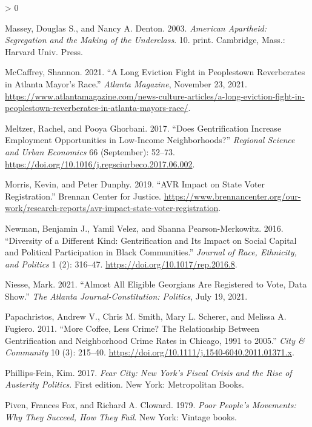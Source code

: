 \documentclass[
  12pt,
]{article}
\newlength{\cslhangindent}
\newenvironment{CSLReferences}[2] %
 {%
  \setlength{\parindent}{0pt}
  \ifodd #1 \everypar{\setlength{\hangindent}{\cslhangindent}}\ignorespaces\fi
  \ifnum #2 > 0
  \setlength{\parskip}{#2\baselineskip}
  \fi
 }%
 {}
\begin{document}
\begin{CSLReferences}{1}{0}
\leavevmode\hypertarget{ref-Massey2003}{}%
Massey, Douglas S., and Nancy A. Denton. 2003. \emph{American Apartheid: Segregation and the Making of the Underclass}. 10. print. {Cambridge, Mass.}: {Harvard Univ. Press}.

\leavevmode\hypertarget{ref-McCaffrey2021}{}%
McCaffrey, Shannon. 2021. {``A Long Eviction Fight in {Peoplestown} Reverberates in {Atlanta} Mayor's Race.''} \emph{Atlanta Magazine}, November 23, 2021. \url{https://www.atlantamagazine.com/news-culture-articles/a-long-eviction-fight-in-peoplestown-reverberates-in-atlanta-mayors-race/}.

\leavevmode\hypertarget{ref-Meltzer2017}{}%
Meltzer, Rachel, and Pooya Ghorbani. 2017. {``Does Gentrification Increase Employment Opportunities in Low-Income Neighborhoods?''} \emph{Regional Science and Urban Economics} 66 (September): 52--73. \url{https://doi.org/10.1016/j.regsciurbeco.2017.06.002}.

\leavevmode\hypertarget{ref-Morris2019a}{}%
Morris, Kevin, and Peter Dunphy. 2019. {``{AVR Impact} on {State Voter Registration}.''} {Brennan Center for Justice}. \url{https://www.brennancenter.org/our-work/research-reports/avr-impact-state-voter-registration}.

\leavevmode\hypertarget{ref-Newman2016}{}%
Newman, Benjamin J., Yamil Velez, and Shanna Pearson-Merkowitz. 2016. {``Diversity of a {Different Kind}: {Gentrification} and {Its Impact} on {Social Capital} and {Political Participation} in {Black Communities}.''} \emph{Journal of Race, Ethnicity, and Politics} 1 (2): 316--47. \url{https://doi.org/10.1017/rep.2016.8}.

\leavevmode\hypertarget{ref-Niesse2021a}{}%
Niesse, Mark. 2021. {``Almost All Eligible {Georgians} Are Registered to Vote, Data Show.''} \emph{The Atlanta Journal-Constitution: Politics}, July 19, 2021.

\leavevmode\hypertarget{ref-Papachristos2011}{}%
Papachristos, Andrew V., Chris M. Smith, Mary L. Scherer, and Melissa A. Fugiero. 2011. {``More {Coffee}, {Less Crime}? {The Relationship} Between {Gentrification} and {Neighborhood Crime Rates} in {Chicago}, 1991 to 2005.''} \emph{City \& Community} 10 (3): 215--40. \url{https://doi.org/10.1111/j.1540-6040.2011.01371.x}.

\leavevmode\hypertarget{ref-Phillips-Fein2017}{}%
Phillips-Fein, Kim. 2017. \emph{Fear City: {New York}'s Fiscal Crisis and the Rise of Austerity Politics}. First edition. {New York}: {Metropolitan Books}.

\leavevmode\hypertarget{ref-Piven1979}{}%
Piven, Frances Fox, and Richard A. Cloward. 1979. \emph{Poor People's Movements: Why They Succeed, How They Fail}. {New York}: {Vintage books}.


\end{CSLReferences}
\end{document}
